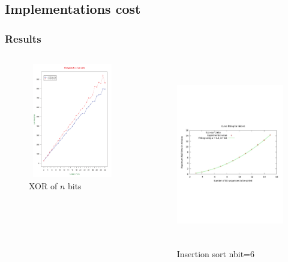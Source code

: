 \documentclass{beamer}
\begin{document}
\subsection{Implementations cost}

\begin{frame} \frametitle{Results}

\begin{columns}
\begin{column}[c]{3cm}
\begin{figure}%
\vspace{-3ex}
\centering
\includegraphics[width=5cm, height=5cm]{f4.pdf} 
\caption{XOR of $n$ bits} 
\end{figure}
\end{column}
\begin{column}[c]{5cm}
\begin{figure}
\vspace{-2cm}
\centering
\includegraphics[width=6cm, height=8cm]{fsort1.pdf} 
\caption{Insertion sort nbit=6} 
\end{figure}
\end{column}
\end{columns}

\end{frame}
\end{document}
